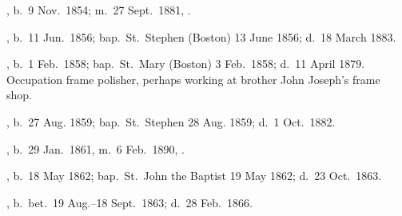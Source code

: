 \begin{Kids}
	, b.\ 9 Nov.\ 1854; m.\ 27 Sept.\ 1881, .
	
	, b.\ 11 Jun.\ 1856;\cite{Mary3OBrienBirth} bap.\ St.\ Stephen (Boston) 13 June 1856;\cite{Mary3OBrienBaptism} d.\ 18 March 1883.\cite{Mary3OBrienDeath}
	
	, b.\ 1 Feb.\ 1858;\cite{James3OBrienBirth} bap.\ St.\ Mary (Boston) 3 Feb.\ 1858;\cite{James3OBrienBaptism} d.\ 11 April 1879. Occupation frame polisher,\cite{James3OBrienDeath} perhaps working at brother John Joseph's frame shop.
	
	, b.\ 27 Aug. 1859;\cite{Ellen3OBrien2Baptism:1} bap.\ St.\ Stephen 28 Aug. 1859;\cite{Ellen3OBrien2Baptism:2} d.\ 1 Oct.\ 1882.\cite{Ellen3OBrien2Death}
	
	, b.\ 29 Jan.\ 1861, m.\ 6 Feb.\ 1890, .
	
	, b.\ 18 May 1862;\cite{Margaret3OBrienBaptism:1} bap.\ St.\ John the Baptist 19 May 1862;\cite{Margaret3OBrienBaptism:2} d.\ 23 Oct.\ 1863.\cite{Margaret3OBrienDeath}
	
	, b.\ bet.\ 19 Aug.--18 Sept.\ 1863;\cite{Anna3OBrienDeath:1} d.\ 28 Feb.\ 1866.\cite{Anna3OBrienDeath:2}
	
\end{Kids}